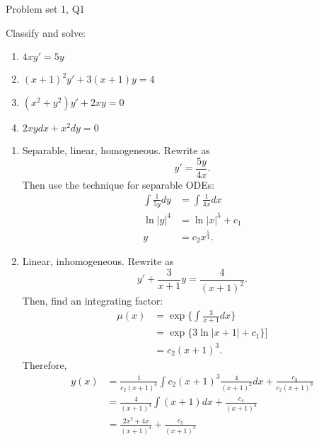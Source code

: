 \begin{problem}{Problem set 1, Q1}{}


    Classify and solve:
        \begin{enumerate}
            \item $4xy' = 5y$
            \item $(x + 1)^2 y' + 3(x + 1)y = 4$
            \item $(x^2 + y^2) y' + 2xy = 0$
            \item $2xy dx + x^2 dy = 0$
        \end{enumerate}

    \tcblower

    \begin{enumerate}
        \item Separable, linear, homogeneous. Rewrite as
            $$ y' = \frac{5y}{4x} . $$
        Then use the technique for separable ODEs:
            \begin{align*}
                \int \frac{1}{5y} dy
                    &= \int \frac{1}{4x} dx \\
                \ln \lvert y \rvert^4
                    &= \ln \lvert x \rvert^5 + c_1 \\
                y &= c_2 x^\frac{5}{4} .
            \end{align*}
        \item Linear, inhomogeneous. Rewrite as
            $$ y' + \frac{3}{x+1}y = \frac{4}{(x+1)^2} . $$
        Then, find an integrating factor:
            \begin{align*}
                \mu(x) &= \exp \biggl\{ 
                    \int \frac{3}{x+1} dx \biggr\} \\
                &= \exp \{ 3 \ln \lvert x + 1 \rvert + c_1 \}] \\
                &= c_2 (x+1)^3 .
            \end{align*}
        Therefore,
            \begin{align*}
                y(x) &= \frac{1}{c_2 (x+1)^3}
                    \int c_2 (x+1)^3 \frac{4}{(x+1)^2} dx
                    + \frac{c_3}{c_2(x+1)^3} \\
                &= \frac{4}{(x+1)^3} \int (x + 1) dx 
                    + \frac{c_4}{(x+1)^3} \\
                &= \frac{2x^2 + 4x}{(x+1)^3}
                    + \frac{c_5}{(x+1)^3} \\

\end{align*}
\end{enumerate}
\end{problem}

